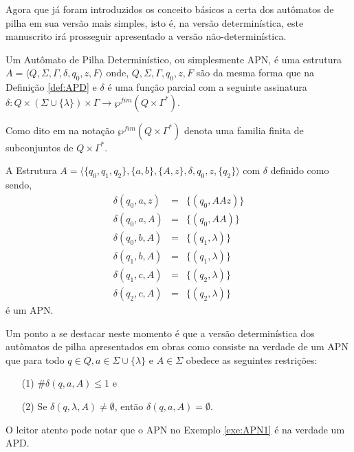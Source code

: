 Agora que já foram introduzidos os conceito básicos a certa dos autômatos de pilha em sua versão mais simples, isto é, na versão determinística, este manuscrito irá prosseguir apresentado a versão não-determinística.

\begin{definition}\label{def:APN}
    Um Autômato de Pilha Determinístico, ou simplesmente APN, é uma estrutura $A = \langle Q, \Sigma, \Gamma, \delta, q_0, z, F\rangle$ onde, $Q, \Sigma, \Gamma, q_0, z, F$ são da mesma forma que na Definição \ref{def:APD} e $\delta$ é uma função parcial com a seguinte assinatura $\delta: Q \times (\Sigma \cup \{\lambda\}) \times \Gamma \rightarrow \wp^{fim}(Q \times \Gamma^*)$.
\end{definition}

\begin{remark}
    Como dito em \cite{harrison1978} na notação $\wp^{fim}(Q \times \Gamma^*)$ denota uma familia finita de subconjuntos de $Q \times \Gamma^*$.
\end{remark}

\begin{example}\label{exe:APN1}
    A Estrutura $A = \langle \{q_0, q_1, q_2\}, \{a, b\}, \{A, z\}, \delta, q_0, z, \{q_2\} \rangle$ com $\delta$ definido como sendo, 
    \begin{eqnarray*}
        \delta(q_0, a, z) & = & \{(q_0, AAz)\}\\
        \delta(q_0, a, A) & = & \{(q_0, AA)\}\\
        \delta(q_0, b, A) & = & \{(q_1, \lambda)\}\\
        \delta(q_1, b, A) & = & \{(q_1, \lambda)\}\\
        \delta(q_1, c, A) & = & \{(q_2, \lambda)\}\\
        \delta(q_2, c, A) & = & \{(q_2, \lambda)\}
    \end{eqnarray*}
    é um APN.
\end{example}

Um ponto a se destacar neste momento é que a versão determinística dos autômatos de pilha apresentados em obras como \cite{harrison1978, hopcroft2008, sipser2010} consiste na verdade de um APN que para todo $q \in Q, a \in \Sigma \cup \{\lambda\}$ e $A \in \Sigma$ obedece as seguintes restrições:
\begin{itemize}
    \item[(1)] $\# \delta(q, a, A) \leq 1$ e 
    \item[(2)] Se $\delta(q, \lambda, A) \neq \emptyset$, então $\delta(q, a, A) = \emptyset$.
\end{itemize}
O leitor atento pode notar que o APN no Exemplo \ref{exe:APN1} é na verdade um APD.

